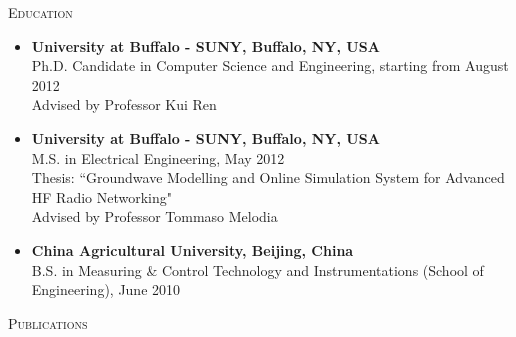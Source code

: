 \documentclass[letter]{article}
\newcommand{\heading}[1]{\item \large \textsc{#1} \normalsize}
\newcommand{\publication}[4]{\item #1. #2. \emph{#3.} #4}
\begin{document}
\begin{description}
\heading{Education}

\begin{itemize}
\item \textbf{University at Buffalo - SUNY, Buffalo, NY, USA} \\
Ph.D. Candidate in Computer Science and Engineering, starting from August 2012\\
Advised by Professor Kui Ren

\item \textbf{University at Buffalo - SUNY, Buffalo, NY, USA} \\
M.S. in Electrical Engineering, May 2012\\
Thesis: ``Groundwave Modelling and Online Simulation System for Advanced HF Radio Networking" \\
Advised by Professor Tommaso Melodia

\item \textbf{China Agricultural University, Beijing, China} \\
B.S. in Measuring \& Control Technology and Instrumentations (School of Engineering), June 2010\\
\end{itemize}

%




\heading{Publications}









\end{description}
\end{document}
